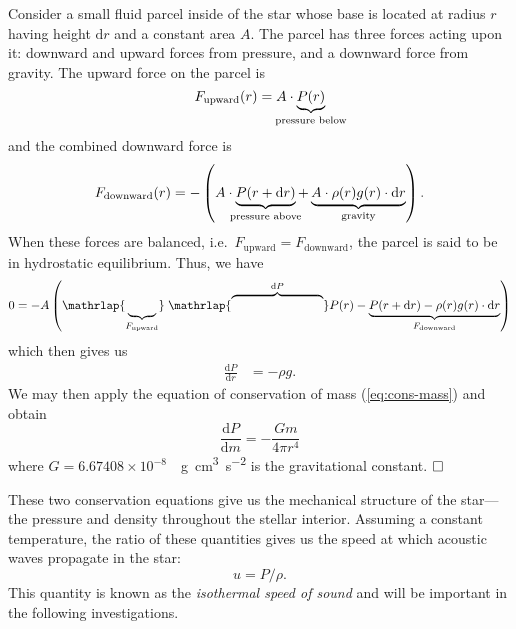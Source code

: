 \begin{description}
    Consider a small fluid parcel inside of the star whose base is located at radius $r$ having height ${\text{d}r}$ and a constant area $A$. 
    The parcel has three forces acting upon it: downward and upward forces from pressure, and a downward force from gravity. 
    The upward force on the parcel is 
    \begin{equation}
        F_{\text{upward}} (r) = A \cdot \underbrace{P(r)}_{\makebox[0pt]{\text{\scriptsize pressure below}}}
    \end{equation}
    and the combined downward force is
    \begin{equation}
        F_{\text{downward}} (r)
        = -\left(
            A \cdot \underbrace{P(r+\text{d}r)}_{\makebox[0pt]{\text{\scriptsize pressure above}}} + \underbrace{A \cdot \rho(r) g(r) \cdot \text{d}r}_{\text{gravity}}
        \right).
    \end{equation}
    When these forces are balanced, i.e.~${F_{\text{upward}} = F_{\text{downward}}}$, the parcel is said to be in hydrostatic equilibrium. 
    Thus, we have
    \begin{equation}
        0 = 
        -A\left( 
                \mathrlap{\underbrace{\phantom{\;P(r)}}_{F_{\text{upward}}}}
                \;\mathrlap{\overbrace{\phantom{P(r) - P(r+\text{d}r)}}^{\text{d}P}}
                P(r) - 
                \underbrace{
                    P(r+\text{d}r) - \rho(r) g(r) \cdot \text{d}r
                }_{F_{\text{downward}}}
        \right)
    \end{equation}
    which then gives us
    \begin{align} \label{eq:cons-mom-r}
        \frac{\text{d} P}{\text{d} r} &= -\rho g.
    \end{align}
    We may then apply the equation of conservation of mass (\ref{eq:cons-mass}) and obtain
    \begin{equation} \label{eq:cons-mom} \boxed{
        \frac{\text{d} P}{\text{d} m} = -\frac{Gm}{4\pi r^4}
    }\end{equation}
    where ${G = 6.67408\times 10^{-8}}$~\si{\per\g\cm\cubed\per\square\s} is the gravitational constant. $\hfill\square\;$
    
    These two conservation equations give us the mechanical structure of the star---the pressure and density throughout the stellar interior. 
    Assuming a constant temperature, the ratio of these quantities gives us the speed at which acoustic waves propagate in the star:
    \begin{equation} \label{eq:u}
        u = P/\rho.
    \end{equation}
    This quantity is known as the \emph{ isothermal speed of sound} and will be important in the following investigations. 
    

\end{description}
